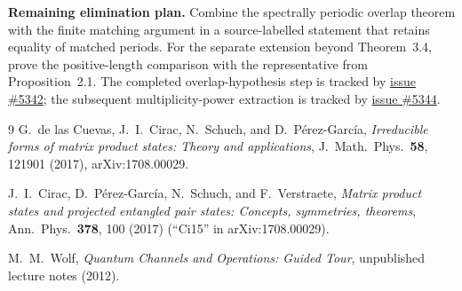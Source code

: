 \documentclass{article}
\begin{document}
\textbf{Remaining elimination plan.} Combine the spectrally periodic overlap
theorem with the finite matching argument in a source-labelled statement that
retains equality of matched periods.  For the separate extension beyond
Theorem~3.4, prove the positive-length comparison with the representative from
Proposition~2.1.  The completed overlap-hypothesis step is tracked by
\href{https://github.com/LionSR/TNLean/issues/5342}{issue \#5342}; the subsequent
multiplicity-power extraction is tracked by
\href{https://github.com/LionSR/TNLean/issues/5344}{issue \#5344}.

\begin{thebibliography}{9}
G.~de las Cuevas, J.~I.~Cirac, N.~Schuch, and D.~P\'erez-Garc\'ia,
\emph{Irreducible forms of matrix product states: Theory and applications},
J.~Math.~Phys.\ \textbf{58}, 121901 (2017), arXiv:1708.00029.

J.~I.~Cirac, D.~P\'erez-Garc\'ia, N.~Schuch, and F.~Verstraete,
\emph{Matrix product states and projected entangled pair states: Concepts,
symmetries, theorems}, Ann.\ Phys.\ \textbf{378}, 100 (2017)
(``Ci15'' in arXiv:1708.00029).

M.~M.~Wolf, \emph{Quantum Channels and Operations: Guided Tour}, unpublished
lecture notes (2012).
\end{thebibliography}
\end{document}
